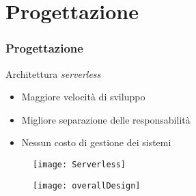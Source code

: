 
\section{Progettazione}
\begin{frame}

  \frametitle{Progettazione}

  Architettura \textit{serverless}
  \begin{itemize}
  \item Maggiore velocit\`a di sviluppo
  \item Migliore separazione delle responsabilit\`a
  \item Nessun costo di gestione dei sistemi
  \end{itemize}

  \begin{figure}[H]
    \centering
    \texttt{[image: Serverless]}
  \end{figure}
\end{frame}

\begin{frame}

  \begin{figure}[H]
    \centering
    \texttt{[image: overallDesign]}
  \end{figure}
\end{frame}

